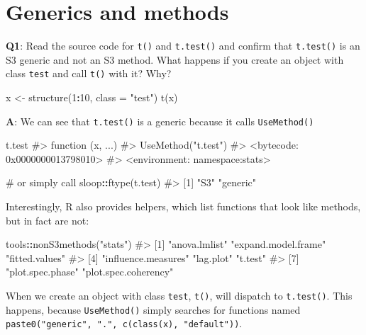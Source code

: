 \documentclass[
]{krantz}
\makeatletter
\newenvironment{Shaded}{\begin{snugshade}}{\end{snugshade}}
\newcommand{\CommentTok}[1]{\textcolor[rgb]{0.56,0.35,0.01}{\textit{#1}}}
\newcommand{\DataTypeTok}[1]{\textcolor[rgb]{0.13,0.29,0.53}{#1}}
\newcommand{\DecValTok}[1]{\textcolor[rgb]{0.00,0.00,0.81}{#1}}
\newcommand{\KeywordTok}[1]{\textcolor[rgb]{0.13,0.29,0.53}{\textbf{#1}}}
\newcommand{\NormalTok}[1]{#1}
\newcommand{\OperatorTok}[1]{\textcolor[rgb]{0.81,0.36,0.00}{\textbf{#1}}}
\newcommand{\StringTok}[1]{\textcolor[rgb]{0.31,0.60,0.02}{#1}}
\newenvironment{kframe}{%
\medskip{}
\setlength{\fboxsep}{.8em}
 \def\at@end@of@kframe{}%
 \ifinner\ifhmode%
  \def\at@end@of@kframe{\end{minipage}}%
  \begin{minipage}{\columnwidth}%
 \fi\fi%
 \def\FrameCommand##1{\hskip\@totalleftmargin \hskip-\fboxsep
 \colorbox{shadecolor}{##1}\hskip-\fboxsep
     \hskip-\linewidth \hskip-\@totalleftmargin \hskip\columnwidth}%
 \MakeFramed {\advance\hsize-\width
   \@totalleftmargin\z@ \linewidth\hsize
   \@setminipage}}%
 {\par\unskip\endMakeFramed%
 \at@end@of@kframe}
\renewenvironment{Shaded}{\begin{kframe}}{\end{kframe}}
\renewcommand{\KeywordTok} [1]{\textcolor[rgb]{0.00,0.44,0.13}{{#1}}}
\renewcommand{\DataTypeTok}[1]{\textcolor[rgb]{0.56,0.13,0.00}{{#1}}}
\renewcommand{\DecValTok}  [1]{\textcolor[rgb]{0.25,0.63,0.44}{{#1}}}
\renewcommand{\StringTok}  [1]{\textcolor[rgb]{0.25,0.44,0.63}{{#1}}}
\renewcommand{\CommentTok} [1]{\textcolor[rgb]{0.38,0.63,0.69}{{#1}}}
\renewcommand{\NormalTok}  [1]{{#1}}
\makeatother
\begin{document}
\hypertarget{generics-and-methods}{%
\section{Generics and methods}\label{generics-and-methods}}

\textbf{{Q1}}: Read the source code for \texttt{t()} and \texttt{t.test()} and confirm that \texttt{t.test()} is an S3 generic and not an S3 method. What happens if you create an object with class \texttt{test} and call \texttt{t()} with it? Why?

\begin{Shaded}
\begin{Highlighting}[]
\NormalTok{x <-}\StringTok{ }\KeywordTok{structure}\NormalTok{(}\DecValTok{1}\OperatorTok{:}\DecValTok{10}\NormalTok{, }\DataTypeTok{class =} \StringTok{"test"}\NormalTok{)}
\KeywordTok{t}\NormalTok{(x)}
\end{Highlighting}
\end{Shaded}

\textbf{{A}}: We can see that \texttt{t.test()} is a generic because it calls \texttt{UseMethod()}

\begin{Shaded}
\begin{Highlighting}[]
\NormalTok{t.test}
\CommentTok{#> function (x, ...) }
\CommentTok{#> UseMethod("t.test")}
\CommentTok{#> <bytecode: 0x0000000013798010>}
\CommentTok{#> <environment: namespace:stats>}

\CommentTok{# or simply call}
\NormalTok{sloop}\OperatorTok{::}\KeywordTok{ftype}\NormalTok{(t.test)}
\CommentTok{#> [1] "S3"      "generic"}
\end{Highlighting}
\end{Shaded}

Interestingly, R also provides helpers, which list functions that look like methods, but in fact are not:

\begin{Shaded}
\begin{Highlighting}[]
\NormalTok{tools}\OperatorTok{::}\KeywordTok{nonS3methods}\NormalTok{(}\StringTok{"stats"}\NormalTok{)}
\CommentTok{#> [1] "anova.lmlist"        "expand.model.frame"  "fitted.values"      }
\CommentTok{#> [4] "influence.measures"  "lag.plot"            "t.test"             }
\CommentTok{#> [7] "plot.spec.phase"     "plot.spec.coherency"}
\end{Highlighting}
\end{Shaded}

When we create an object with class \texttt{test}, \texttt{t()}, will dispatch to \texttt{t.test()}. This happens, because \texttt{UseMethod()} simply searches for functions named \texttt{paste0("generic",\ ".",\ c(class(x),\ "default"))}.
\end{document}
